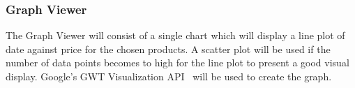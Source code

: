 \subsubsection{Graph Viewer}

The Graph Viewer will consist of a single chart which will display a line plot of date against price for the chosen products. A scatter plot will be used if the number of data points becomes to high for the line plot to present a good visual display. Google's GWT Visualization API~\cite{viz} will be used to create the graph.

